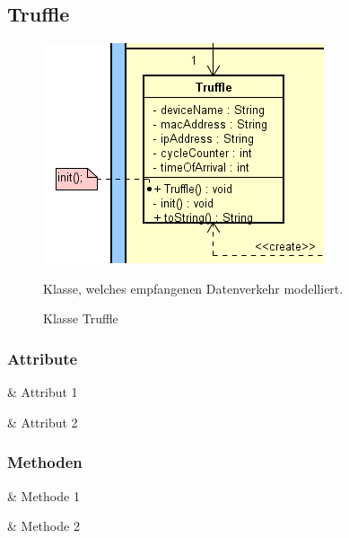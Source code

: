 \subsection{Truffle}

\begin{figure}[H]
    \centering
    \includegraphics[width=\textwidth]{../diagramimages/Truffle.png}
    \caption[Klasse Truffle]{Klasse Truffle}
    \medskip
    Klasse, welches empfangenen Datenverkehr modelliert.
\end{figure}

\subsubsection*{Attribute}

\begin{easylist}[itemize]

    & Attribut 1

    & Attribut 2

\end{easylist}

\subsubsection*{Methoden}

\begin{easylist}[itemize]

    & Methode 1

    & Methode 2

\end{easylist}

